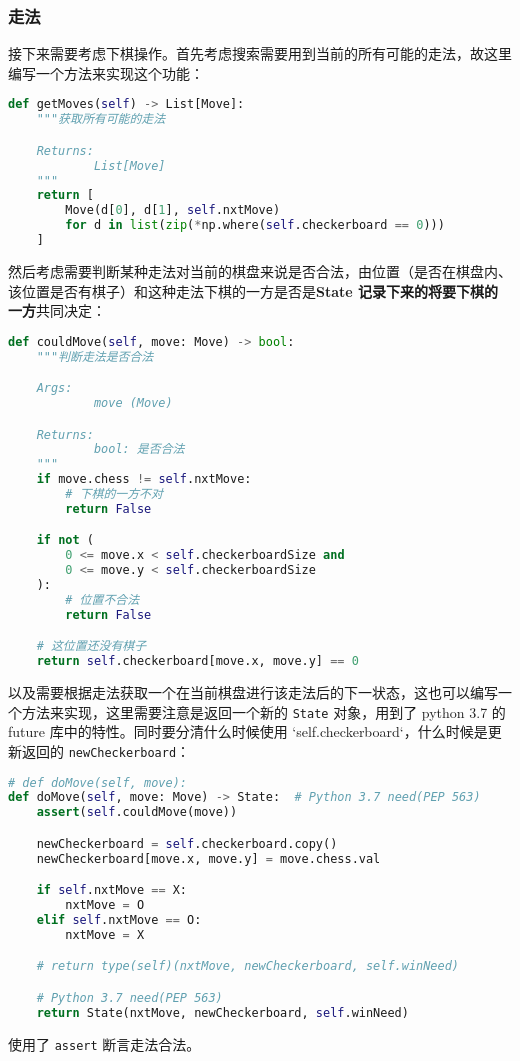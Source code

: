 \subsubsection{走法}
接下来需要考虑下棋操作。首先考虑搜索需要用到当前的所有可能的走法，故这里编写一个方法来实现这个功能：
\begin{lstlisting}[language=python]
def getMoves(self) -> List[Move]:
    """获取所有可能的走法

    Returns:
            List[Move]
    """
    return [
        Move(d[0], d[1], self.nxtMove)
        for d in list(zip(*np.where(self.checkerboard == 0)))
    ]
\end{lstlisting}

然后考虑需要判断某种走法对当前的棋盘来说是否合法，由位置（是否在棋盘内、该位置是否有棋子）和这种走法下棋的一方是否是\textbf{State 记录下来的将要下棋的一方}共同决定：
\begin{lstlisting}[language=python]
def couldMove(self, move: Move) -> bool:
    """判断走法是否合法

    Args:
            move (Move)

    Returns:
            bool: 是否合法
    """
    if move.chess != self.nxtMove:
        # 下棋的一方不对
        return False

    if not (
        0 <= move.x < self.checkerboardSize and
        0 <= move.y < self.checkerboardSize
    ):
        # 位置不合法
        return False

    # 这位置还没有棋子
    return self.checkerboard[move.x, move.y] == 0
\end{lstlisting}

以及需要根据走法获取一个在当前棋盘进行该走法后的下一状态，这也可以编写一个方法来实现，这里需要注意是返回一个新的 \verb`State` 对象，用到了 python 3.7 的 future 库中的特性。同时要分清什么时候使用 `self.checkerboard`，什么时候是更新返回的 \verb`newCheckerboard`：
\begin{lstlisting}[language=python]
# def doMove(self, move):
def doMove(self, move: Move) -> State:  # Python 3.7 need(PEP 563)
    assert(self.couldMove(move))

    newCheckerboard = self.checkerboard.copy()
    newCheckerboard[move.x, move.y] = move.chess.val

    if self.nxtMove == X:
        nxtMove = O
    elif self.nxtMove == O:
        nxtMove = X

    # return type(self)(nxtMove, newCheckerboard, self.winNeed)

    # Python 3.7 need(PEP 563)
    return State(nxtMove, newCheckerboard, self.winNeed)
\end{lstlisting}
使用了 \verb`assert` 断言走法合法。

